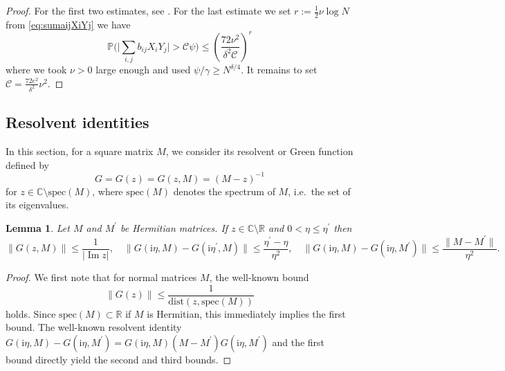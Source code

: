 \documentclass[11pt]{article}
\DeclareMathOperator{\Ima}{Im}
\newcommand{\ii}{\mathrm{i}}
\newcommand{\abs}[1]{\left| #1 \right|}
\newcommand{\absbb}[1]{\biggl| #1 \biggr|}
\newcommand{\R}{\mathbb{R}}
\newcommand{\C}{\mathbb{C}}
\renewcommand{\Im}{\Ima}
\theoremstyle{plain}
\newtheorem{lemma}{Lemma}[section]
\theoremstyle{remark}
\numberwithin{equation}{section}
\begin{document}
	\begin{proof}
		For the first two estimates, see \cite[Corollary A.21]{alt2021delocalization}. For the last estimate we set $r:=\frac{1}{2} \nu \log N$ from \eqref{eq:sumaijXiYj} we have
		\begin{equation*}
			\mathbb{P} \biggl( \absbb{ \sum_{i,j} b_{ij}X_i Y_j} > \mathcal{C} \psi \biggr) \le \left(\frac{ 72 \nu^2}{\delta^2 \mathcal{C}} \right)^r
		\end{equation*}
		where we took $\nu>0$ large enough and used $\psi/ \gamma \ge N^{\delta /4}$. It remains to set $\mathcal{C} = \frac{72 e^2}{\delta^2} \nu^2$.
	\end{proof}
	
   	\subsection{Resolvent identities} \label{sec:resolvent_identities} 
   	
	In this section, for a square matrix $M$, we consider its resolvent or Green function defined by 
	\begin{equation}
		G = G(z) = G(z,M) =  (M - z)^{-1} 
	\end{equation}
	for $z \in\C \setminus \mathrm{spec}(M)$, where $\mathrm{spec}(M)$ denotes the spectrum of $M$, i.e.\ the set of its eigenvalues. 
	\begin{lemma}\label{lem:disttospect}
		Let $M$ and $M^\prime$ be Hermitian matrices. If $z \in \C\setminus \R$ and $0 < \eta \le \eta^{\prime}$ then 
		\begin{equation*}
			\|G(z, M)\| \le \frac{1}{\abs{\Im z}}, \quad 
			\|G(\ii \eta,  M) - G(\ii \eta^\prime, M)\| \le \frac{\eta^{\prime} - \eta}{\eta^2}, \quad  
			\|G(\ii \eta,  M) - G(\ii \eta, M^\prime)\| \le \frac{\|M - M^{\prime}\|}{\eta^2}.
		\end{equation*}
	\end{lemma}
	\begin{proof} 
		We first note that for normal matrices $M$, the well-known bound 
		\begin{equation*}
			\|G(z)\| \le \frac{1}{\mathrm{dist}(z, \mathrm{spec}(M))} 
		\end{equation*}
		holds. Since $\mathrm{spec}(M) \subset \R$ if $M$ is Hermitian, this immediately implies the first bound. The well-known resolvent identity $G(\ii \eta,  M) - G(\ii \eta, M^\prime) = G(\ii \eta,  M) (M-M^{\prime}) G(\ii \eta, M^\prime)$ and the first bound directly yield the second and third bounds. 
	\end{proof} 
	
\end{document}
